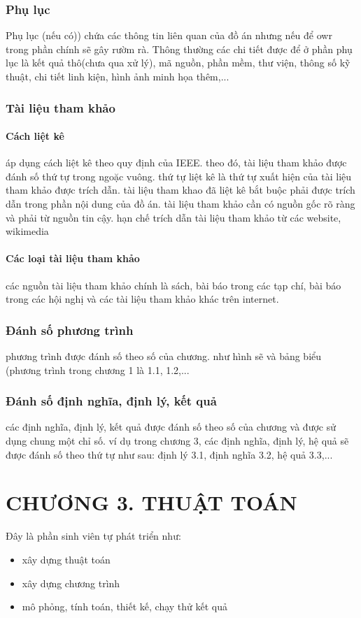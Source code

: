 \documentclass{article}
\begin{document}
\subsubsection{Phụ lục}
Phụ lục (nếu có)) chứa các thông tin liên quan của đồ án nhưng nếu để owr trong phần chính sẽ gây rườm rà. Thông thường các chi tiết được để ở phần phụ lục là kết quả thô(chưa qua xử lý), mã nguồn, phần mềm, thư viện, thông số kỹ thuật, chi tiết linh kiện, hình ảnh minh họa thêm,...
\subsubsection{Tài liệu tham khảo}
\paragraph{Cách liệt kê} \mbox{}

áp dụng cách liệt kê theo quy định của IEEE. theo đó, tài liệu tham khảo được đánh số thứ tự trong ngoặc vuông. thứ tự liệt kê là thứ tự xuất hiện của tài liệu tham khảo được trích dẫn. tài liệu tham khao đã liệt kê bắt buộc phải được trích dẫn trong phần nội dung của đồ án. tài liệu tham khảo cần có nguồn gốc rõ ràng và phải từ nguồn tin cậy. hạn chế trích dẫn tài liệu tham khảo từ các website, wikimedia
\paragraph{Các loại tài liệu tham khảo}\mbox{}

các nguồn tài liệu tham khảo chính là sách, bài báo trong các tạp chí, bài báo trong các hội nghị và các tài liệu tham khảo khác trên internet. 

\subsubsection{Đánh số phương trình}
phương trình được đánh số theo số của chương. như hình sẽ và bảng biểu (phương trình trong chương 1 là 1.1, 1.2,...

\subsubsection{Đánh số định nghĩa, định lý, kết quả}
các định nghĩa, định lý, kết quả được đánh số theo số của chương và được sử dụng chung một chỉ số. ví dụ trong chương 3, các định nghĩa, định lý, hệ quả sẽ được đánh số theo thứ tự như sau: định lý 3.1, định nghĩa 3.2, hệ quả 3.3,...

\newpage
\section*{CHƯƠNG 3. THUẬT TOÁN}
{}
\setcounter{section}{3}
\setcounter{subsection}{0}
\setcounter{figure}{0}
\setcounter{table}{0}
Đây là phần sinh viên tự phát triển như:
\begin{itemize}
    \item xây dựng thuật toán
    \item xây dựng chương trình
    \item mô phỏng, tính toán, thiết kế, chạy thử kết quả
\end{itemize}
\end{document}
